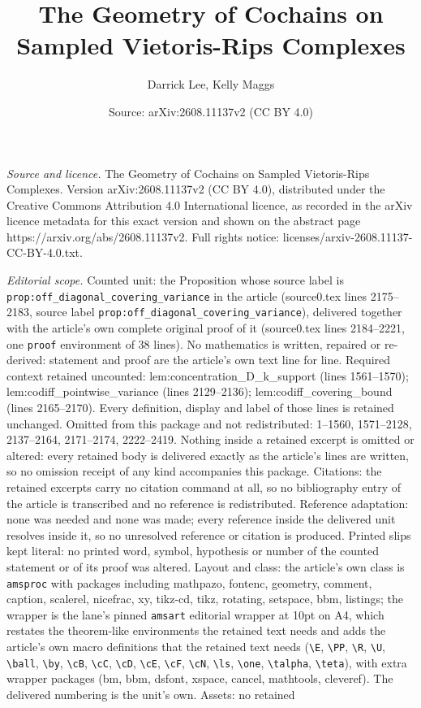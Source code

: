 \documentclass[10pt,a4paper]{amsart}
\title[The Geometry of Cochains on Sampled Vietoris-Rips Complexes]{The Geometry of Cochains on Sampled Vietoris-Rips Complexes}
\author{Darrick Lee, Kelly Maggs}
\date{Source: arXiv:2608.11137v2 (CC BY 4.0)}
\begin{document}
\maketitle

\noindent\emph{Source and licence.} The Geometry of Cochains on Sampled Vietoris-Rips Complexes. Version arXiv:2608.11137v2 (CC BY 4.0), distributed under the Creative Commons Attribution 4.0 International licence, as recorded in the arXiv licence metadata for this exact version and shown on the abstract page https://arxiv.org/abs/2608.11137v2. Full rights notice: licenses/arxiv-2608.11137-CC-BY-4.0.txt.\par\smallskip

\noindent\textit{Editorial scope.} Counted unit: the Proposition whose source label is \texttt{prop:off\_diagonal\_covering\_variance} in the article (source0.tex lines 2175--2183, source label \texttt{prop:off\_diagonal\_covering\_variance}), delivered together with the article's own complete original proof of it (source0.tex lines 2184--2221, one \texttt{proof} environment of 38 lines). No mathematics is written, repaired or re-derived: statement and proof are the article's own text line for line. Required context retained uncounted: lem:concentration\_D\_k\_support (lines 1561--1570); lem:codiff\_pointwise\_variance (lines 2129--2136); lem:codiff\_covering\_bound (lines 2165--2170). Every definition, display and label of those lines is retained unchanged. Omitted from this package and not redistributed: 1--1560, 1571--2128, 2137--2164, 2171--2174, 2222--2419. Nothing inside a retained excerpt is omitted or altered: every retained body is delivered exactly as the article's lines are written, so no omission receipt of any kind accompanies this package. Citations: the retained excerpts carry no citation command at all, so no bibliography entry of the article is transcribed and no reference is redistributed. Reference adaptation: none was needed and none was made; every reference inside the delivered unit resolves inside it, so no unresolved reference or citation is produced. Printed slips kept literal: no printed word, symbol, hypothesis or number of the counted statement or of its proof was altered. Layout and class: the article's own class is \texttt{amsproc} with packages including mathpazo, fontenc, geometry, comment, caption, scalerel, nicefrac, xy, tikz-cd, tikz, rotating, setspace, bbm, listings; the wrapper is the lane's pinned \texttt{amsart} editorial wrapper at 10pt on A4, which restates the theorem-like environments the retained text needs and adds the article's own macro definitions that the retained text needs (\texttt{\textbackslash E}, \texttt{\textbackslash PP}, \texttt{\textbackslash R}, \texttt{\textbackslash U}, \texttt{\textbackslash ball}, \texttt{\textbackslash by}, \texttt{\textbackslash cB}, \texttt{\textbackslash cC}, \texttt{\textbackslash cD}, \texttt{\textbackslash cE}, \texttt{\textbackslash cF}, \texttt{\textbackslash cN}, \texttt{\textbackslash ls}, \texttt{\textbackslash one}, \texttt{\textbackslash talpha}, \texttt{\textbackslash teta}), with extra wrapper packages (bm, bbm, dsfont, xspace, cancel, mathtools, cleveref). The delivered numbering is the unit's own. Assets: no retained 
\end{document}
